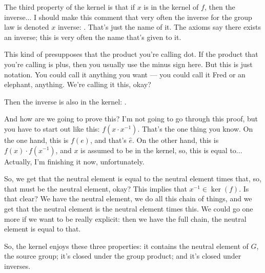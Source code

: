 \begin{speech}[00:23:03 - 00:25:05]
The third property of the kernel is that if $x$ is in the kernel of $f$,  then the inverse... I should make this comment that very often the inverse for the group law is denoted $x$ inverse: . That's just the name of it. The axioms say there exists an inverse; this is very often the name that's given to it.

This kind of presupposes that the product you're calling dot. If the product that you're calling is plus, then you usually use the minus sign here. But this is just notation. You could call it anything you want --- you could call it Fred or an elephant, anything. We're calling it this, okay?

Then the inverse is also in the kernel: .

And how are we going to prove this? I'm not going to go through this proof, but you have to start out like this:  $f(x \cdot x^{-1})$. That's the one thing you know. On the one hand, this is $f(e)$, and that's $\hat{e}$.  On the other hand, this is $f(x) \cdot f(x^{-1})$,  and $x$ is assumed to be in the kernel, so, this is equal to... Actually, I'm finishing it now, unfortunately. 

So, we get that the neutral element is equal to the neutral element times that, so, that must be the neutral element, okay? This implies that $x^{-1} \in \operatorname{ker}(f)$.  Is that clear? We have the neutral element, we do all this chain of things, and we get that the neutral element is the neutral element times this. We could go one more if we want to be really explicit: then we have the full chain, the neutral element is equal to that.

So, the kernel enjoys these three properties: it contains the neutral element of $G$, the source group; it's closed under the group product; and it's closed under inverses.
\end{speech}

